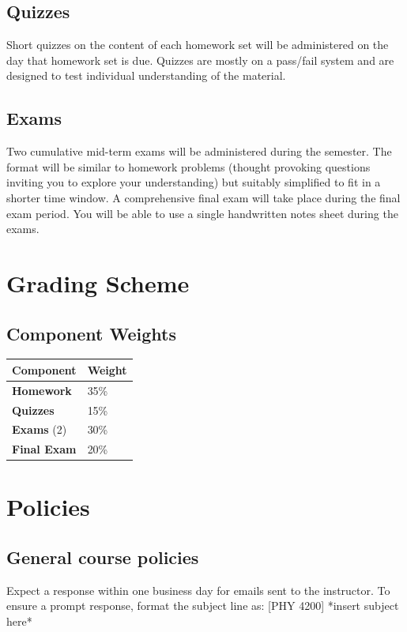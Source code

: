 \documentclass{syllabus}
\begin{document}
\subsection{Quizzes} 
Short quizzes on the content of each homework set will be administered on the day that homework set is due. Quizzes are mostly on a pass/fail system and are designed to test individual understanding of the material. 

\subsection{Exams} 
Two cumulative mid-term exams will be administered during the semester. The format will be similar to homework problems (thought provoking questions inviting you to explore your understanding) but suitably simplified to fit in a shorter time window. A comprehensive final exam will take place during the final exam period. You will be able to use a single handwritten notes sheet during the exams.

\section*{Grading Scheme}
\subsection*{Component Weights}

\noindent\begin{tabular}{ll}
\textbf{Component} & \textbf{Weight}       \\ \hline
\textbf{Homework}            & 35\%       \\
\textbf{Quizzes}            & 15\%       \\
\textbf{Exams} (2) & 30\% \\
\textbf{Final Exam} & 20\% \\
\end{tabular}%





\section*{Policies}
\subsection{General course policies}
Expect a response within one business day for emails sent to the instructor. To ensure a prompt response, format the subject line as: [PHY 4200] *insert subject here*
\end{document}
